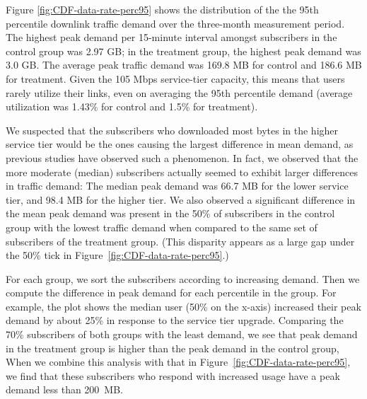 Figure \ref{fig:CDF-data-rate-perc95} shows the distribution of the the
95th percentile downlink traffic demand over the three-month measurement
period. The highest peak demand per 15-minute interval amongst
subscribers in the control group was 2.97 GB; in the treatment group,
the highest peak demand was 3.0 GB.
The average peak traffic demand was 169.8 MB for control and
186.6 MB for treatment. Given the 105 Mbps service-tier capacity,
this means that users rarely utilize their links,
even on averaging the 95th percentile demand (average utilization was 
1.43\% for control and 1.5\% for treatment).

We suspected that the subscribers who downloaded most bytes in the
higher service tier would be the ones causing the largest difference in
mean demand, as previous studies have observed such a phenomenon. In
  fact, we observed that the more moderate (median) subscribers actually seemed
  to exhibit larger differences in traffic demand: The median peak demand
  was 66.7 MB for the lower service tier, and 98.4 MB for the higher
  tier.   We also observed a significant difference in the mean peak
demand was present in the 50\% of subscribers in the control group
with the lowest traffic demand when compared to the same set of
subscribers of the treatment group. (This disparity appears as a large
gap under the 50\% tick in Figure~\ref{fig:CDF-data-rate-perc95}.)


For each group, we sort the subscribers according to
increasing demand.  Then we compute the difference in peak demand for
each percentile in the group.  For example, the plot shows the median
user (50\% on the x-axis) increased their peak demand by about 25\% in
response to the service tier upgrade.  Comparing the 70\% subscribers of
both groups with the least demand, we see that peak demand in the
treatment group is higher than the peak demand in the control group,
 When we combine this analysis with that in
Figure~\ref{fig:CDF-data-rate-perc95}, we find that these subscribers
who respond with increased usage have a peak demand less than 200~MB.



